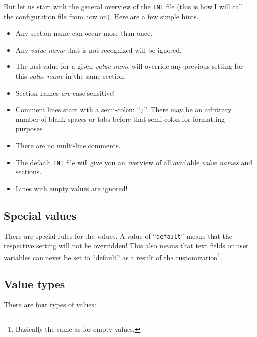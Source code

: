 \documentclass[a4paper,titlepage]{report}
\begin{document}
But let us start with the general overview of the \texttt{INI} file (this is how I will call
the configuration file from now on). Here are a few simple hints.
\begin{itemize}
  \item Any section name can occur more than once.
  \item Any \emph{value name} that is not recognized will be ignored.
  \item The last value for a given \emph{value name} will override any previous setting for this \emph{value name} in the same section.
  \item Section names \emph{are} case-sensitive!
  \item Comment lines start with a semi-colon: ``\verb+;+''. There may be an arbitrary number of blank spaces or tabs before that semi-colon for formatting purposes.
  \item There are no multi-line comments.
  \item The default \texttt{INI} file will give you an overview of all available \emph{value names} and sections.
  \item Lines with empty values are ignored!
\end{itemize}

\subsection{Special values}
There are special rules for the values. A value of ``\texttt{default}'' means that
the respective setting will not be overridden! This also means that text fields or
user variables can never be set to ``default'' as a result of the customization\footnote{Basically
the same as for empty values.}.

\subsection{Value types}
There are four types of values:
\end{document}
